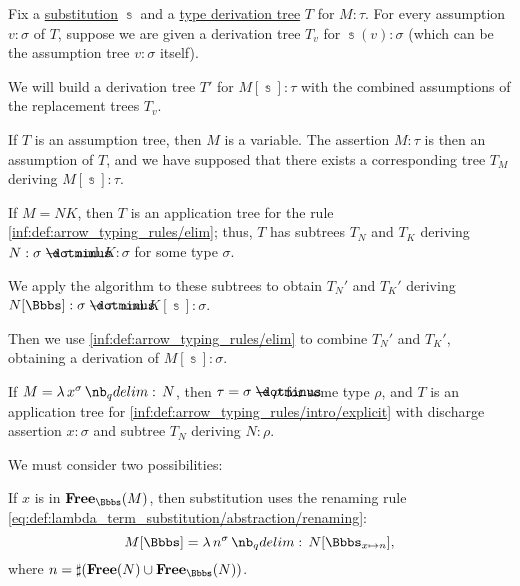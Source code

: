\begin{algorithm}\label{alg:simply_typed_substitution}
  Fix a \hyperref[def:lambda_term_substitution]{substitution} \( \Bbbs \) and a \hyperref[def:type_derivation_tree]{type derivation tree} \( T \) for \( M: \tau \). For every assumption \( v: \sigma \) of \( T \), suppose we are given a derivation tree \( T_v \) for \( \Bbbs(v): \sigma \) (which can be the assumption tree \( v: \sigma \) itself).

  We will build a derivation tree \( T' \) for \( M[\Bbbs]: \tau \) with the combined assumptions of the replacement trees \( T_v \).

  \begin{thmenum}
     If \( T \) is an assumption tree, then \( M \) is a variable. The assertion \( M: \tau \) is then an assumption of \( T \), and we have supposed that there exists a corresponding tree \( T_M \) deriving \( M[\Bbbs]: \tau \).

     If \( M = NK \), then \( T \) is an application tree for the rule \ref{inf:def:arrow_typing_rules/elim}; thus, \( T \) has subtrees \( T_N \) and \( T_K \) deriving \( N: \sigma \synimplies \tau \) and \( K: \sigma \) for some type \( \sigma \).

    We apply the algorithm to these subtrees to obtain \( T_N' \) and \( T_K' \) deriving \( N[\Bbbs]: \sigma \synimplies \tau \) and \( K[\Bbbs]: \sigma \).

    Then we use \ref{inf:def:arrow_typing_rules/elim} to combine \( T_N' \) and \( T_K' \), obtaining a derivation of \( M[\Bbbs]: \sigma \).

     If \( M = \qabs {x^\sigma} N \), then \( \tau = \sigma \synimplies \rho \) for some type \( \rho \), and \( T \) is an application tree for \ref{inf:def:arrow_typing_rules/intro/explicit} with discharge assertion \( x: \sigma \) and subtree \( T_N \) deriving \( N: \rho \).

    We must consider two possibilities:
    \begin{thmenum}
       If \( x \) is in \( \op*{Free}_\Bbbs(M) \), then substitution uses the renaming rule \eqref{eq:def:lambda_term_substitution/abstraction/renaming}:
      \begin{equation*}
        M[\Bbbs] = \qabs {n^\sigma} N[\Bbbs_{x \mapsto n}],
      \end{equation*}
      where \( n = \sharp(\op*{Free}(N) \cup \op*{Free}_\Bbbs(N)) \).


\end{thmenum}
\end{thmenum}
\end{algorithm}
